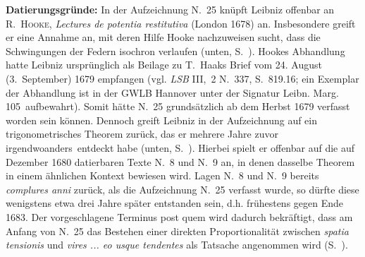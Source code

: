 \begin{ledgroup}
\footnotesize
\pstart
\noindent
\textbf{Datierungsgründe:}
In der Aufzeichnung N.~25 knüpft Leibniz offenbar an %
R.~\textsc{Hooke}, \cite{01241}\textit{Lectures de potentia restitutiva} (London 1678) an.
Insbesondere greift er eine Annahme an, mit deren Hilfe Hooke nachzuweisen sucht, dass die Schwingungen der Federn isochron verlaufen (unten, S.~).
Hookes Abhandlung %
hatte Leibniz ursprünglich als Beilage zu T.~Haaks Brief vom 24. August (3.~September) 1679 empfangen
(vgl. \cite{01242}\textit{LSB} III,~2 N.~337, S.~819.16;
ein Exemplar der Abhandlung ist in der GWLB Hannover unter der Signatur \glqq Leibn. Marg. 105\grqq\ aufbewahrt).
Somit hätte N.~25 grundsätzlich ab dem Herbst 1679 verfasst worden sein können.
Dennoch greift Leibniz in der Aufzeichnung auf ein trigonometrisches Theorem zurück,
das er \glqq mehrere Jahre zuvor irgendwoanders\grqq\ entdeckt habe (unten, S.~).
Hierbei spielt er offenbar auf die auf Dezember 1680 datierbaren Texte N.~8 und N.~9 an, in denen dasselbe Theorem in einem ähnlichen Kontext bewiesen wird.
Lagen N.~8 und N.~9 bereits \textit{complures anni} zurück, als die Aufzeichnung N.~25 verfasst wurde, so dürfte diese wenigstens etwa drei Jahre später entstanden sein, d.h. frühestens gegen Ende 1683.
\pend%
\pstart%
Der vorgeschlagene Terminus post quem wird dadurch bekräftigt, dass am Anfang von N.~25 das Bestehen einer direkten Proportionalität zwischen \textit{spatia tensionis} und \textit{vires ... eo usque tendentes} als Tatsache angenommen wird (S.~).

\end{ledgroup}
